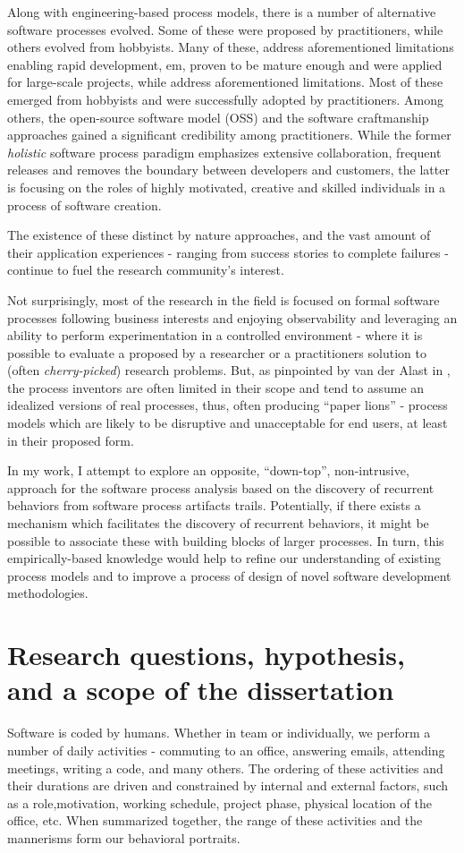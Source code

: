 Along with engineering-based process models, there is a number of alternative software processes evolved. 
Some of these were proposed by practitioners, while others evolved from hobbyists. Many of these, 
address aforementioned limitations enabling rapid development, em, proven to be mature enough and were applied for
large-scale projects, while address aforementioned 
limitations. Most of these emerged from hobbyists and were successfully adopted by practitioners.
Among others, the open-source software model (OSS) and the software craftmanship approaches gained a 
significant credibility among practitioners.
While the former \textit{holistic} software process paradigm emphasizes extensive collaboration, frequent releases 
and removes the boundary between developers and customers, the latter is focusing on the roles 
of highly motivated, creative and skilled individuals in a process of software creation. 

The existence of these distinct by nature approaches, and the vast amount of their application experiences -
ranging from success stories to complete failures - continue to fuel the research community's interest. 

Not surprisingly, most of the research in the field is focused on formal software processes following business 
interests and enjoying observability and leveraging an ability to perform experimentation in a controlled environment -
where it is possible to evaluate a proposed by a researcher or a practitioners solution to 
(often \textit{cherry-picked}) research problems. 
But, as pinpointed by van der Alast in \cite{citeulike:9758924}, the process inventors are often limited in their
scope and tend to assume an idealized versions of real processes, thus, often producing ``paper lions'' - 
process models which are likely to be disruptive and unacceptable for end users, at least in their proposed form.

In my work, I attempt to explore an opposite, ``down-top'', non-intrusive, approach for the software 
process analysis based on the discovery of recurrent behaviors from software process artifacts trails. 
Potentially, if there exists a mechanism which facilitates the discovery of recurrent behaviors, 
it might be possible to associate these with building blocks of larger processes. In turn, this empirically-based 
knowledge would help to refine our understanding of existing process models and to improve a process of 
design of novel software development methodologies.

\section{Research questions, hypothesis, and a scope of the dissertation}
Software is coded by humans. Whether in team or individually, we perform a number of daily activities - 
commuting to an office, answering emails, attending meetings, writing a code, and many others. 
The ordering of these activities and their durations are driven and constrained by internal and external factors, 
such as a role,motivation, working schedule, project phase, physical location of the office, etc. 
When summarized together, the range of these activities and the mannerisms form our behavioral portraits.

